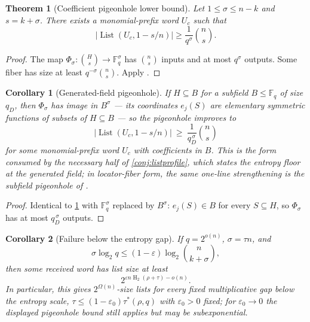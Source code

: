 \documentclass[11pt]{article}
\newtheorem{theorem}{Theorem}[section]
\newtheorem{corollary}[corollary]{Corollary}
\theoremstyle{definition}
\newcommand{\F}{\mathbb F}
\newcommand{\eps}{\varepsilon}
\newcommand{\HH}{\operatorname{H}_2}
\newcommand{\taustar}{\tau^{*}}
\newcommand{\List}{\operatorname{List}}
\begin{document}
\begin{theorem}[Coefficient pigeonhole lower bound]\label{thm:pigeonhole}
Let $1\le\sigma\le n-k$ and $s=k+\sigma$.  There exists a monomial-prefix word $U_c$ such that
\[
        |\List(U_c,1-s/n)|\ge \frac{1}{q^\sigma}\binom ns.
\]
\end{theorem}

\begin{proof}
The map $\Phi_\sigma:\binom Hs\to\F_q^\sigma$ has $\binom ns$ inputs and at most $q^\sigma$ outputs.  Some fiber has size at least $q^{-\sigma}\binom ns$.  Apply .
\end{proof}

\begin{corollary}[Generated-field pigeonhole]\label{cor:genfield-pigeonhole}
If $H\subseteq B$ for a subfield $B\le\F_q$ of size $q_D$, then $\Phi_\sigma$ has image in $B^\sigma$ --- its coordinates $e_j(S)$ are elementary symmetric functions of subsets of $H\subseteq B$ --- so the pigeonhole improves to
\[
        |\List(U_c,1-s/n)|\ \ge\ \frac{1}{q_D^{\,\sigma}}\binom ns
\]
for some monomial-prefix word $U_c$ with coefficients in $B$.  This is the form consumed by the necessary half of \cref{conj:listprofile}, which states the entropy floor at the generated field; in locator-fiber form, the same one-line strengthening is the subfield pigeonhole of \cite[Lem.\ ``locator fibers are lists'']{UniversalCap}.
\end{corollary}

\begin{proof}
Identical to \cref{thm:pigeonhole} with $\F_q^\sigma$ replaced by $B^\sigma$: $e_j(S)\in B$ for every $S\subseteq H$, so $\Phi_\sigma$ has at most $q_D^{\,\sigma}$ outputs.
\end{proof}

\begin{corollary}[Failure below the entropy gap]\label{cor:entropy-lower}
If $q=2^{o(n)}$, $\sigma=\tau n$, and
\[
        \sigma\log_2q\le (1-\eps)\log_2\binom n{k+\sigma},
\]
then some received word has list size at least
\[
        2^{\eps n\HH(\rho+\tau)-o(n)}.
\]
In particular, this gives $2^{\Omega(n)}$-size lists for every fixed multiplicative gap below the entropy scale, $\tau\le(1-\eps_0)\taustar(\rho,q)$ with $\eps_0>0$ fixed; for $\eps_0\to0$ the displayed pigeonhole bound still applies but may be subexponential.
\end{corollary}
\end{document}
